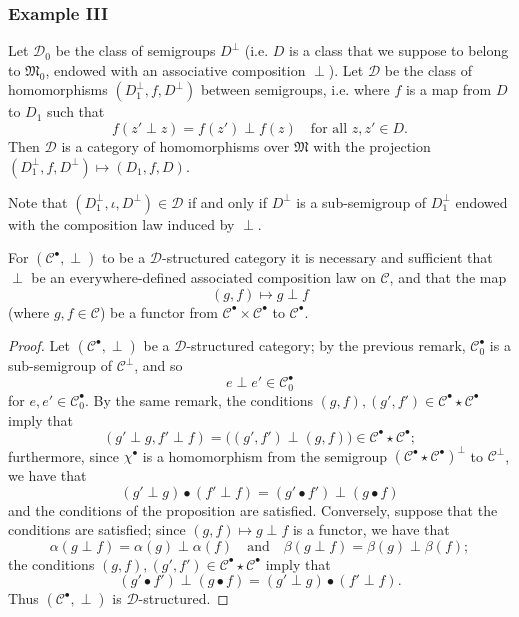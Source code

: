 \documentclass[a4paper,fleqn]{article}
\theoremstyle{plain}
\newenvironment{proposition}[1]
  {\renewcommand\theinnerproposition{#1}\innerproposition}
  {\endinnerproposition}
\theoremstyle{definition}
\newcommand{\textand}{\quad\text{and}\quad}
\newcommand{\CC}{\mathcal{C}}
\newcommand{\MM}{\mathfrak{M}}
\newcommand{\DD}{\mathcal{D}}
\begin{document}
\subsubsection*{Example III}
\label{section:ii.3.iii}

Let $\DD_0$ be the class of semigroups $D^\perp$ (i.e. $D$ is a class that we suppose to belong to $\MM_0$, endowed with an associative composition $\perp$).
Let $\DD$ be the class of homomorphisms $(D_1^\perp,f,D^\perp)$ between semigroups, i.e. where $f$ is a map from $D$ to $D_1$ such that
\[
  f(z'\perp z)
  = f(z')\perp f(z)
  \quad\text{for all $z,z'\in D$.}
\]
Then $\DD$ is a category of homomorphisms over $\MM$ with the projection $(D_1^\perp,f,D^\perp)\mapsto(D_1,f,D)$.

Note that $(D_1^\perp,\iota,D^\perp)\in\DD$ if and only if $D^\perp$ is a sub-semigroup of $D_1^\perp$ endowed with the composition law induced by $\perp$.

\begin{proposition}{7}
\label{proposition:ii-7}
  For $(\CC^\bullet,\perp)$ to be a $\DD$-structured category it is necessary and sufficient that $\perp$ be an everywhere-defined associated composition law on $\CC$, and that the map
  \[
    (g,f)
    \longmapsto g\perp f
  \]
  (where $g,f\in\CC$) be a functor from $\CC^\bullet\times\CC^\bullet$ to $\CC^\bullet$.
\end{proposition}

\begin{proof}
  Let $(\CC^\bullet,\perp)$ be a $\DD$-structured category;
  by the previous remark, $\CC_0^\bullet$ is a sub-semigroup of $\CC^\perp$, and so
  \[
    e\perp e'
    \in\CC_0^\bullet
  \]
  for $e,e'\in\CC_0^\bullet$.
  By the same remark, the conditions $(g,f),(g',f')\in\CC^\bullet\star\CC^\bullet$ imply that
  \[
    (g'\perp g,f'\perp f)
    = \big(
      (g',f')\perp(g,f)
    \big)
    \in\CC^\bullet\star\CC^\bullet;
  \]
  furthermore, since $\chi^\bullet$ is a homomorphism from the semigroup $(\CC^\bullet\star\CC^\bullet)^\perp$ to $\CC^\perp$, we have that
  \[
    (g'\perp g)\bullet(f'\perp f)
    = (g'\bullet f')\perp(g\bullet f)
  \]
  and the conditions of the proposition are satisfied.
  Conversely, suppose that the conditions are satisfied;
  since $(g,f)\mapsto g\perp f$ is a functor, we have that
  \[
    \alpha(g\perp f)
    =\alpha(g)\perp\alpha(f)
    \textand
    \beta(g\perp f)
    =\beta(g)\perp\beta(f);
  \]
  the conditions $(g,f),(g',f')\in\CC^\bullet\star\CC^\bullet$ imply that
  \[
    (g'\bullet f')\perp(g\bullet f)
    = (g'\perp g)\bullet(f'\perp f).
  \]
  Thus $(\CC^\bullet,\perp)$ is $\DD$-structured.
\end{proof}
\end{document}
